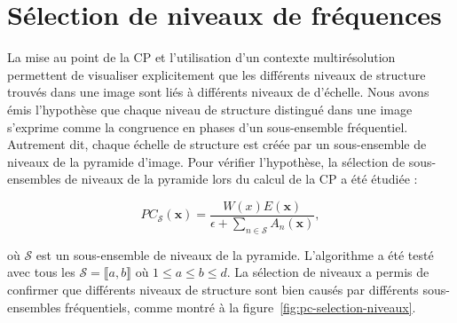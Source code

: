 \section{Sélection de niveaux de fréquences}

La mise au point de la CP et l'utilisation d'un contexte multirésolution permettent de visualiser explicitement que les différents niveaux de structure trouvés dans une image sont liés à différents niveaux de d'échelle. Nous avons émis l'hypothèse que chaque niveau de structure distingué dans une image s'exprime comme la congruence en phases d'un sous-ensemble fréquentiel. Autrement dit, chaque échelle de structure est créée par un sous-ensemble de niveaux de la pyramide d'image. Pour vérifier l'hypothèse, la sélection de sous-ensembles de niveaux de la pyramide lors du calcul de la CP a été étudiée :

\begin{equation}
    PC_{\mathcal{S}}(\mathbf{x}) = \frac{W(x)E(\mathbf{x})}{\epsilon + \sum_{n\in\mathcal{S}} A_{n}(\mathbf{x})},
\end{equation}

\noindent où $\mathcal{S}$ est un sous-ensemble de niveaux de la pyramide. L'algorithme a été testé avec tous les $\mathcal{S} = \llbracket a, b\rrbracket$ où $1 \leq a \leq b \leq d$. La sélection de niveaux a permis de confirmer que différents niveaux de structure sont bien causés par différents sous-ensembles fréquentiels, comme montré à la figure~\ref{fig:pc-selection-niveaux}.

\bigskip

